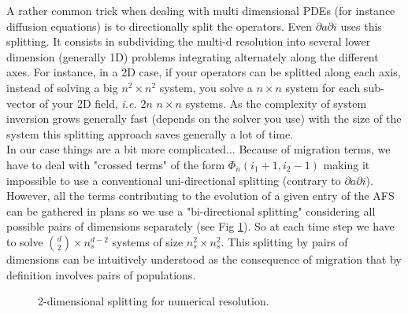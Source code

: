 \documentclass[11pt,a4paper]{article}
\begin{document}
	A rather common trick when dealing with multi dimensional PDEs (for instance diffusion equations) is to directionally split the operators. Even $\partial a \partial i$ uses this splitting. It consists in subdividing the multi-d resolution into several lower dimension (generally 1D) problems integrating alternately along the different axes. For instance, in a 2D case, if your operators can be splitted along each axis, instead of solving a big $n^2 \times n^2$ system, you solve a $n \times n$ system for each sub-vector of your 2D field, \textit{i.e.} $2n$ $n \times n$ systems. As the complexity of system inversion grows generally fast (depends on the solver you use) with the size of the system this splitting approach saves generally a lot of time.\\ 
	
	In our case things are a bit more complicated... Because of migration terms, we have to deal with "crossed terms" of the form $\Phi_n(i_1+1, i_2-1)$ making it impossible to use a conventional uni-directional splitting (contrary to $\partial a \partial i$). However, all the terms contributing to the evolution of a given entry of the AFS can be gathered in plans so we use a "bi-directional splitting" considering all possible pairs of dimensions separately (see Fig \ref{fig:split2d}). So at each time step we have to solve ${d\choose 2} \times n_s^{d-2}$ systems of size $n_s^2 \times n_s^2$. This splitting by pairs of dimensions can be intuitively understood as the consequence of migration that by definition involves pairs of populations.\\
	
	 \begin{figure}[h]
\centering
	\caption{2-dimensional splitting for numerical resolution.}
	\label{fig:split2d}
\end{figure}
	
\end{document}
